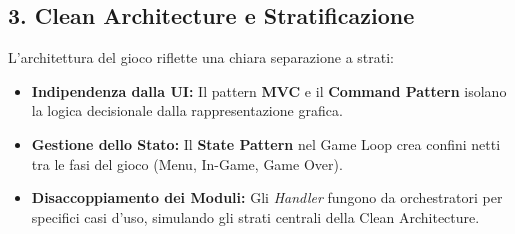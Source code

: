 \documentclass[12pt,a4paper]{article}
\begin{document}
\begin{small}
\subsection*{3. Clean Architecture e Stratificazione}

L'architettura del gioco riflette una chiara separazione a strati:

\begin{itemize}
    \item \textbf{Indipendenza dalla UI:} Il pattern \textbf{MVC} e il \textbf{Command Pattern} isolano la logica decisionale dalla rappresentazione grafica.
    \item \textbf{Gestione dello Stato:} Il \textbf{State Pattern} nel Game Loop crea confini netti tra le fasi del gioco (Menu, In-Game, Game Over).
    \item \textbf{Disaccoppiamento dei Moduli:} Gli \textit{Handler} fungono da orchestratori per specifici casi d'uso, simulando gli strati centrali della Clean Architecture.
\end{itemize}
 \end{small}


\end{document}
